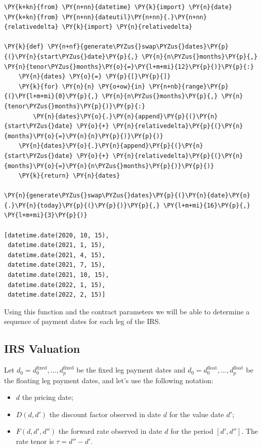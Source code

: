 \begin{tcolorbox}[breakable, size=fbox, boxrule=1pt, pad at break*=1mm,colback=cellbackground, colframe=cellborder]
\begin{Verbatim}[commandchars=\\\{\}]
\PY{k+kn}{from} \PY{n+nn}{datetime} \PY{k}{import} \PY{n}{date}
\PY{k+kn}{from} \PY{n+nn}{dateutil}\PY{n+nn}{.}\PY{n+nn}{relativedelta} \PY{k}{import} \PY{n}{relativedelta}
    
\PY{k}{def} \PY{n+nf}{generate\PYZus{}swap\PYZus{}dates}\PY{p}{(}\PY{n}{start\PYZus{}date}\PY{p}{,} \PY{n}{n\PYZus{}months}\PY{p}{,} \PY{n}{tenor\PYZus{}months}\PY{o}{=}\PY{l+m+mi}{12}\PY{p}{)}\PY{p}{:}
    \PY{n}{dates} \PY{o}{=} \PY{p}{[}\PY{p}{]}
    \PY{k}{for} \PY{n}{n} \PY{o+ow}{in} \PY{n+nb}{range}\PY{p}{(}\PY{l+m+mi}{0}\PY{p}{,} \PY{n}{n\PYZus{}months}\PY{p}{,} \PY{n}{tenor\PYZus{}months}\PY{p}{)}\PY{p}{:}
        \PY{n}{dates}\PY{o}{.}\PY{n}{append}\PY{p}{(}\PY{n}{start\PYZus{}date} \PY{o}{+} \PY{n}{relativedelta}\PY{p}{(}\PY{n}{months}\PY{o}{=}\PY{n}{n}\PY{p}{)}\PY{p}{)}
    \PY{n}{dates}\PY{o}{.}\PY{n}{append}\PY{p}{(}\PY{n}{start\PYZus{}date} \PY{o}{+} \PY{n}{relativedelta}\PY{p}{(}\PY{n}{months}\PY{o}{=}\PY{n}{n\PYZus{}months}\PY{p}{)}\PY{p}{)}
    \PY{k}{return} \PY{n}{dates}

\PY{n}{generate\PYZus{}swap\PYZus{}dates}\PY{p}{(}\PY{n}{date}\PY{o}{.}\PY{n}{today}\PY{p}{(}\PY{p}{)}\PY{p}{,} \PY{l+m+mi}{16}\PY{p}{,} \PY{l+m+mi}{3}\PY{p}{)}

[datetime.date(2020, 10, 15),
 datetime.date(2021, 1, 15),
 datetime.date(2021, 4, 15),
 datetime.date(2021, 7, 15),
 datetime.date(2021, 10, 15),
 datetime.date(2022, 1, 15),
 datetime.date(2022, 2, 15)]
\end{Verbatim}
\end{tcolorbox}
        
Using this function and the contract parameters we will be able to
determine a sequence of payment dates for each leg of the IRS.

\subsection{IRS Valuation}\label{irs-valuation}

Let \(d_0=d_0^{\mathrm{fixed}},...,d_p^{\mathrm{fixed}}\) be the fixed
leg payment dates and
\(d_0=d_0^{\mathrm{float}},...,d_p^{\mathrm{float}}\) be the floating
leg payment dates, and let's use the following notation:

\begin{itemize}
\tightlist
\item
  \(d\) the pricing date;
\item
  \(D(d, d')\) the discount factor observed in date \(d\) for the value
  date \(d'\);
\item
  \(F(d, d', d'')\) the forward rate observed in date \(d\) for the
  period \([d', d'']\). The rate tenor is \(\tau = d'' - d'\).
\end{itemize}

